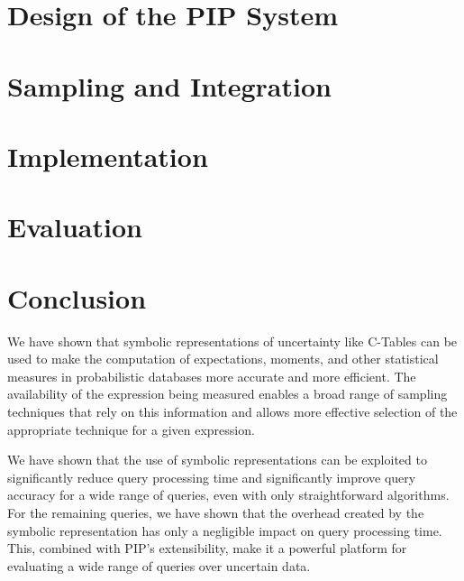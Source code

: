 \documentclass[10pt,conference,letterpaper]{IEEEtran}
\begin{document}
\section{Design of the PIP System}
\label{sec:design}


\section{Sampling and Integration}
\label{sec:sampling}


\section{Implementation}
\label{sec:implementation}


\section{Evaluation}
\label{sec:evaluation}



\section{Conclusion}

We have shown that symbolic representations of uncertainty like C-Tables can be used to make the computation of expectations, moments, and other statistical measures in probabilistic databases more accurate and more efficient.  The availability of the expression being measured enables a broad range of sampling techniques that rely on this information and allows more effective selection of the appropriate technique for a given expression.

We have shown that the use of symbolic representations can be exploited to significantly reduce query processing time and significantly improve query accuracy for a wide range of queries, even with only straightforward algorithms.  For the remaining queries, we have shown that the overhead created by the symbolic representation has only a negligible impact on query processing time.  This, combined with PIP's extensibility, make it a powerful platform for evaluating a wide range of queries over uncertain data.
%
%

\begin{small}


\end{small}
\end{document}
